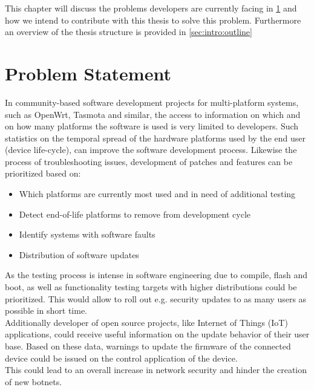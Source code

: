 This chapter will discuss the problems developers are currently facing in \ref{sec:intro:probstatement} and how
we intend to contribute with this thesis to solve this problem. Furthermore an 
overview of the thesis structure is provided in \ref{sec:intro:outline}




\section{Problem Statement}
\label{sec:intro:probstatement}
%
In community-based software development projects for multi-platform systems, such as
OpenWrt, Tasmota and similar, the access to information on which and on how many platforms
the software is used is very limited to developers.
Such statistics on the temporal spread of the hardware platforms used by
the end user (device life-cycle), can improve the software development process.
Likewise the process of troubleshooting issues, development of patches and features can be prioritized based on:
\begin{itemize}
    \item Which platforms are currently most used and in need of additional testing
    \item Detect end-of-life platforms to remove from development cycle
    \item Identify systems with software faults
    \item Distribution of software updates
\end{itemize}

As the testing process is intense in software engineering due to compile, flash and boot, as well as functionality testing targets with higher distributions could be prioritized.
This would allow to roll out e.g. security updates to as many users as possible in short time.\\

Additionally developer of open source projects, like Internet of Things (IoT) applications, could receive useful
information on the update behavior of their user base. Based on these data, warnings to update the firmware of the
connected device could be issued on the control application of the device.\\
This could lead to an overall increase in network security and hinder the creation of new botnets.\\

